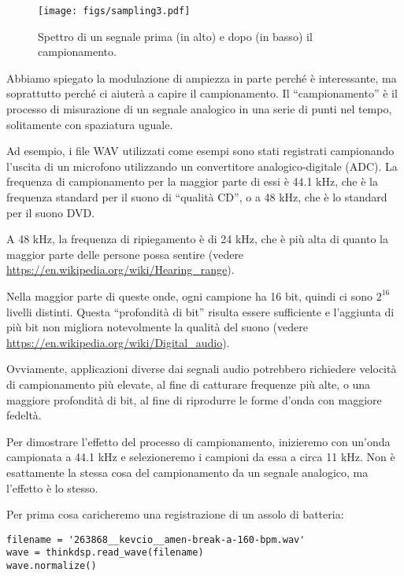 \documentclass[12pt,a4paper]{book}
\begin{document}
\begin{figure} 

\centerline{\texttt{[image: figs/sampling3.pdf]}} \caption{Spettro di un segnale prima (in alto) e dopo (in basso) il campionamento.} \label{fig.sampling3} \end{figure} 

Abbiamo spiegato la modulazione di ampiezza in parte perché è interessante, ma soprattutto perché ci aiuterà a capire il campionamento. Il ``campionamento'' è il processo di misurazione di un segnale analogico in una serie di punti nel tempo, solitamente con spaziatura uguale.

Ad esempio, i file WAV utilizzati come esempi sono stati registrati campionando l'uscita di un microfono utilizzando un convertitore analogico-digitale (ADC). La frequenza di campionamento per la maggior parte di essi è 44.1 kHz, che è la frequenza standard per il suono di ``qualità CD'', o a 48 kHz, che è lo standard per il suono DVD.

A 48 kHz, la frequenza di ripiegamento è di 24 kHz, che è più alta di quanto la maggior parte delle persone possa sentire (vedere \url{https://en.wikipedia.org/wiki/Hearing_range}).

Nella maggior parte di queste onde, ogni campione ha 16 bit, quindi ci sono $2^{16}$ livelli distinti. Questa ``profondità di bit'' risulta essere sufficiente e l'aggiunta di più bit non migliora notevolmente la qualità del suono (vedere \url{https://en.wikipedia.org/wiki/Digital_audio}).

Ovviamente, applicazioni diverse dai segnali audio potrebbero richiedere velocità di campionamento più elevate, al fine di catturare frequenze più alte, o una maggiore profondità di bit, al fine di riprodurre le forme d'onda con maggiore fedeltà.

Per dimostrare l'effetto del processo di campionamento, inizieremo con un'onda campionata a 44.1 kHz e selezioneremo i campioni da essa a circa 11 kHz. Non è esattamente la stessa cosa del campionamento da un segnale analogico, ma l'effetto è lo stesso.

Per prima cosa caricheremo una registrazione di un assolo di batteria:

\begin{verbatim} 
filename = '263868__kevcio__amen-break-a-160-bpm.wav'
wave = thinkdsp.read_wave(filename)
wave.normalize()
 \end{verbatim} 
\end{document}
